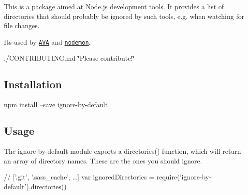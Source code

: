This is a package aimed at Node.\+js development tools. It provides a list of directories that should probably be ignored by such tools, e.\+g. when watching for file changes.

It\textquotesingle{}s used by \href{https://www.npmjs.com/package/ava}{\tt A\+VA} and \href{https://www.npmjs.com/package/nodemon}{\tt nodemon}.

./\+C\+O\+N\+T\+R\+I\+B\+U\+T\+I\+NG.md \char`\"{}\+Please contribute!\char`\"{}

\subsection*{Installation}


\begin{DoxyCode}
npm install --save ignore-by-default
\end{DoxyCode}


\subsection*{Usage}

The {\ttfamily ignore-\/by-\/default} module exports a {\ttfamily directories()} function, which will return an array of directory names. These are the ones you should ignore.


\begin{DoxyCode}
// ['.git', '.sass\_cache', …]
var ignoredDirectories = require('ignore-by-default').directories()
\end{DoxyCode}
 